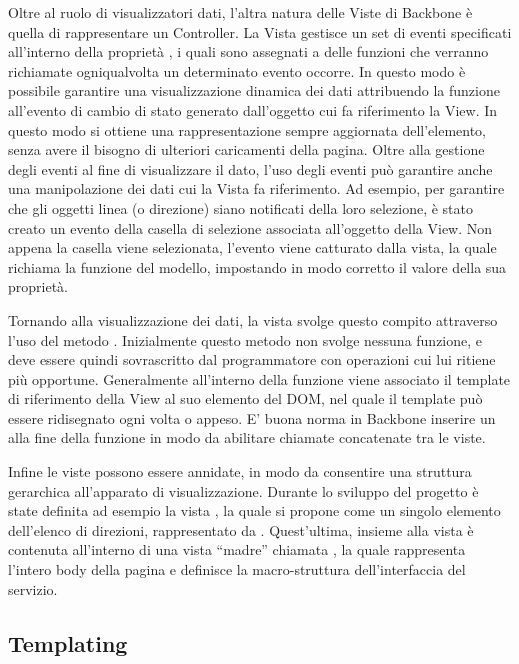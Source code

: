 Oltre al ruolo di visualizzatori dati, l'altra natura delle Viste di Backbone è quella di rappresentare un Controller. La Vista gestisce un set di eventi specificati all'interno della proprietà , i quali sono assegnati a delle funzioni che verranno richiamate ogniqualvolta un determinato evento occorre.
In questo modo è possibile garantire una visualizzazione dinamica dei dati attribuendo la funzione  all'evento di cambio di stato generato dall'oggetto cui fa riferimento la View. In questo modo si ottiene una rappresentazione sempre aggiornata dell'elemento, senza avere il bisogno di ulteriori caricamenti della pagina.
Oltre alla gestione degli eventi al fine di visualizzare il dato, l'uso degli eventi può garantire anche una manipolazione dei dati cui la Vista fa riferimento.
Ad esempio, per garantire che gli oggetti linea (o direzione) siano notificati della loro selezione, è stato creato un evento  della casella di selezione associata all'oggetto della View. Non appena la casella viene selezionata, l'evento viene catturato dalla vista, la quale richiama la funzione  del modello, impostando in modo corretto il valore della sua proprietà.

Tornando alla visualizzazione dei dati, la vista svolge questo compito attraverso l'uso del metodo . Inizialmente questo metodo non svolge nessuna funzione, e deve essere quindi sovrascritto dal programmatore con operazioni cui lui ritiene più opportune.
Generalmente all'interno della funzione  viene associato il template di riferimento della View al suo elemento del DOM, nel quale il template può essere ridisegnato ogni volta o appeso. E' buona norma in Backbone inserire un  alla fine della funzione  in modo da abilitare chiamate concatenate tra le viste.

Infine le viste possono essere annidate, in modo da consentire una struttura gerarchica all'apparato di visualizzazione. Durante lo sviluppo del progetto è state definita ad esempio la vista , la quale si propone come un singolo elemento dell'elenco di direzioni, rappresentato da . Quest'ultima, insieme alla vista  è contenuta all'interno di una vista ``madre'' chiamata , la quale rappresenta l'intero body della pagina e definisce la macro-struttura dell'interfaccia del servizio.

\subsection{Templating} %
\label{sub:templating}

